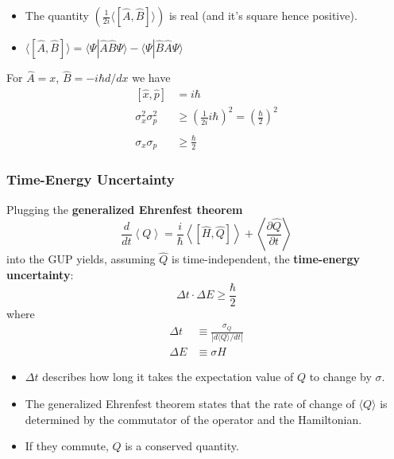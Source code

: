 
\begin{itemize}
    \item The quantity $\left(\frac1{2i}\langle[\hat{A},\hat{B}]\rangle\right)$ is real (and it's square hence positive).
    \item $\langle[\hat{A},\hat{B}]\rangle=\langle\Psi|\hat{A}\hat{B}\Psi\rangle-\langle\Psi|\hat{B}\hat{A}\Psi\rangle$
\end{itemize}

\begin{examplesection}
    For $\hat{A}=x$, $\hat{B}=-i\hbar d/dx$ we have
    \begin{align*}
        \left[\hat{x},\hat{p}\right] & =i\hbar                                                                      \\
        \sigma_{x}^{2}\sigma_{p}^{2} & \geq{\left(\frac{1}{2i}i\hbar\right)}^{2}={\left(\frac{\hbar}{2}\right)}^{2} \\                                                           \\
        \sigma_{x}\sigma_{p}         & \geq\frac{\hbar}{2}
    \end{align*}
\end{examplesection}

\subsubsection{Time-Energy Uncertainty}
Plugging the \textbf{generalized Ehrenfest theorem}
\begin{equation*}
    \frac{d}{dt}\left\langle Q\right\rangle=\frac{i}{\hbar}\left\langle\left[\hat{H},\hat{Q}\right]\right\rangle+\left\langle\frac{\partial\hat{Q}}{\partial t}\right\rangle
\end{equation*}
into the GUP yields, assuming $\hat{Q}$ is time-independent, the \textbf{time-energy uncertainty}:
\begin{equation*}
    \Delta t\cdot\Delta E\geqslant\frac\hbar2
\end{equation*}
where
\begin{align*}
    \Delta t & \equiv \frac{\sigma_Q}{|d\langle Q\rangle/dt|} \\
    \Delta E & \equiv \sigma H
\end{align*}


\begin{itemize}
    \item $\Delta t$ describes how long it takes the expectation value of $Q$ to change by $\sigma$.
    \item The generalized Ehrenfest theorem states that the rate of change of $\langle Q \rangle$ is determined by the commutator of the operator and the Hamiltonian.
    \item If they commute, $Q$ is a conserved quantity.
\end{itemize}